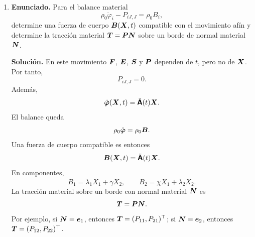 \documentclass[11pt]{article}
\def\vec   #1{\mbox{\boldmath $#1$}{}}
\def\ten   #1{\mbox{\boldmath $#1$}{}}
\def\mat   #1{\mbox{\boldmath $\mathsf #1$}}
\DeclareMathOperator{\tr}{tr}
\begin{document}
\begin{enumerate}[label=\textbf{\arabic*.}, leftmargin=*]
\begin{enumerate}[label=(\alph*), leftmargin=*]
    Para la matriz dada,
    \[
        \ten F=
        \begin{pmatrix}
            \lambda_1&\gamma\\
            \chi&\lambda_2
        \end{pmatrix},
        \qquad
        \ten F^\top\ten F=
        \begin{pmatrix}
            \lambda_1^2+\chi^2&\lambda_1\gamma+\chi\lambda_2\\
            \lambda_1\gamma+\chi\lambda_2&\gamma^2+\lambda_2^2
        \end{pmatrix}.
    \]
    Así,
    \[
    \begin{aligned}
        E_{11}&=\frac12(\lambda_1^2+\chi^2-1),\\
        E_{22}&=\frac12(\gamma^2+\lambda_2^2-1),\\
        E_{12}=E_{21}&=\frac12(\lambda_1\gamma+\chi\lambda_2),
    \end{aligned}
    \]
    y
    \[
        \tr\ten E=\frac12(\lambda_1^2+\chi^2+\gamma^2+\lambda_2^2-2).
    \]
    Por tanto,
    \[
    \begin{aligned}
        S_{11}&=\lambda_{\mathrm L}\tr(\ten E)+2\mu_{\mathrm L}E_{11},\\
        S_{22}&=\lambda_{\mathrm L}\tr(\ten E)+2\mu_{\mathrm L}E_{22},\\
        S_{12}=S_{21}&=2\mu_{\mathrm L}E_{12}.
    \end{aligned}
    \]
    Finalmente,
    \[
        \ten P=	en F\ten S
        =
        \begin{pmatrix}
            \lambda_1S_{11}+\gamma S_{12} & \lambda_1S_{12}+\gamma S_{22}\\
            \chi S_{11}+\lambda_2S_{12} & \chi S_{12}+\lambda_2S_{22}
        \end{pmatrix}.
    \]

    \item \textbf{Enunciado.} Para el balance material
    \[
        \rho_0\ddot\varphi_i-P_{iJ,J}=\rho_0B_i,
    \]
    determine una fuerza de cuerpo $\vec B(\vec X,t)$ compatible con el movimiento afín y determine la tracción material $\vec T=\ten P\vec N$ sobre un borde de normal material $\vec N$.

    \textbf{Solución.} En este movimiento $\ten F$, $\ten E$, $\ten S$ y $\ten P$ dependen de $t$, pero no de $\vec X$. Por tanto,
    \[
        P_{iJ,J}=0.
    \]
    Además,
    \[
        \ddot{\vec\varphi}(\vec X,t)=\ddot{\mat A}(t)\vec X.
    \]
    El balance queda
    \[
        \rho_0\ddot{\vec\varphi}=\rho_0\vec B.
    \]
    Una fuerza de cuerpo compatible es entonces
    \[
        \vec B(\vec X,t)=\ddot{\mat A}(t)\vec X.
    \]
    En componentes,
    \[
        B_1=\ddot\lambda_1X_1+\ddot\gamma X_2,
        \qquad
        B_2=\ddot\chi X_1+\ddot\lambda_2X_2.
    \]
    La tracción material sobre un borde con normal material $\vec N$ es
    \[
        \vec T=\ten P\vec N.
    \]
    Por ejemplo, si $\vec N=\vec e_1$, entonces $\vec T=(P_{11},P_{21})^\top$; si $\vec N=\vec e_2$, entonces $\vec T=(P_{12},P_{22})^\top$.


\end{enumerate}
\end{enumerate}
\end{document}
